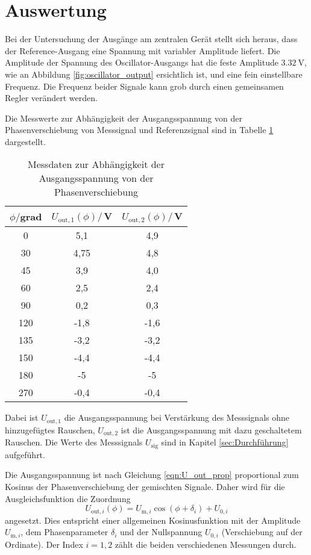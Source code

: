 \section{Auswertung}
\label{sec:Auswertung}

Bei der Untersuchung der Ausgänge am zentralen Gerät stellt sich heraus, dass
der Reference-Ausgang eine Spannung mit variabler Amplitude liefert. Die Amplitude
der Spannung des Oscillator-Ausgangs hat die feste Amplitude $\SI{3,32}{\volt}$,
wie an Abbildung \ref{fig:oscillator_output} ersichtlich ist, und eine fein einstellbare
Frequenz. Die Frequenz beider Signale kann grob durch einen gemeinsamen Regler verändert
werden.

Die Messwerte zur Abhängigkeit der Ausgangsspannung von der Phasenverschiebung
von Messsignal und Referenzsignal sind in Tabelle \ref{tab:phase} dargestellt.

\begin{table}
\centering
\caption{Messdaten zur Abhängigkeit der Ausgangsspannung von der Phasenverschiebung}
\label{tab:phase}
\begin{tabular}{c c c}
\toprule
$\phi/$grad & $U_\mathrm{out,1}(\phi)/$\,V & $U_\mathrm{out,2}(\phi)/$\,V \\
\midrule
  0	& 5,1	 & 4,9  \\
 30	&	4,75 & 4,8  \\
 45	&	3,9	 & 4,0  \\
 60	&	2,5	 & 2,4  \\
 90	&	0,2	 & 0,3  \\
120 &	-1,8 & -1,6 \\
135 &	-3,2 & -3,2 \\
150 &	-4,4 & -4,4 \\
180 &	-5   & -5   \\
270 &	-0,4 & -0,4 \\
\bottomrule
\end{tabular}
\end{table}

Dabei ist $U_\mathrm{out,1}$ die Ausgangsspannung bei Verstärkung des Messsignals
ohne hinzugefügtes Rauschen, $U_\mathrm{out,2}$ ist die Ausgangsspannung mit dazu geschaltetem
Rauschen. Die Werte des Messsignals $U_\mathrm{sig}$ sind in Kapitel \ref{sec:Durchführung}
aufgeführt.

Die Ausgangsspannung ist nach Gleichung \eqref{eqn:U_out_prop} proportional zum Kosinus der
Phasenverschiebung der gemischten Signale. Daher wird für die Ausgleichsfunktion
die Zuordnung
\begin{equation}
  U_{\mathrm{out,}i}(\phi) = U_{\mathrm{m,}i} \cos(\phi+\delta_i)+ U_{0,i}
  \label{eqn:fit}
\end{equation}
angesetzt. Dies entspricht einer allgemeinen Kosinusfunktion mit der Amplitude
$U_{\mathrm{m},i}$, dem Phasenparameter $\delta_i$ und der Nullspannung $U_{0,i}$ (Verschiebung
auf der Ordinate). Der Index $i=1,2$ zählt die beiden verschiedenen Messungen durch.

